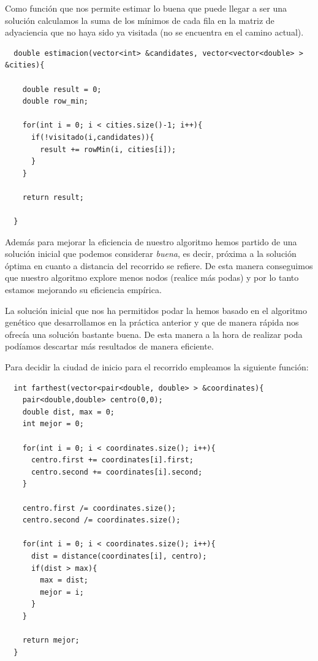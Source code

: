 \documentclass{article}
\begin{document}
Como función que nos permite estimar lo buena que puede llegar a ser
una solución calculamos la suma de los mínimos de cada fila en la
matriz de adyaciencia que no haya sido ya visitada (no se encuentra en
el camino actual).

\begin{lstlisting}
  double estimacion(vector<int> &candidates, vector<vector<double> > &cities){

    double result = 0;
    double row_min;

    for(int i = 0; i < cities.size()-1; i++){
      if(!visitado(i,candidates)){
        result += rowMin(i, cities[i]);
      }
    }

    return result;

  }
\end{lstlisting}

Además para mejorar la eficiencia de nuestro algoritmo hemos partido
de una solución inicial que podemos considerar \textit{buena}, es
decir, próxima a la solución óptima en cuanto a distancia del
recorrido se refiere. De esta manera conseguimos que nuestro algoritmo
explore menos nodos (realice más podas) y por lo tanto estamos
mejorando su eficiencia empírica.

La solución inicial que nos ha permitidos podar la hemos basado en el
algoritmo genético que desarrollamos en la práctica anterior y que de
manera rápida nos ofrecía una solución bastante buena. De esta manera
a la hora de realizar poda podíamos descartar más resultados de manera
eficiente.

Para decidir la ciudad de inicio para el recorrido empleamos la siguiente función:

\begin{lstlisting}
  int farthest(vector<pair<double, double> > &coordinates){
    pair<double,double> centro(0,0);
    double dist, max = 0;
    int mejor = 0;

    for(int i = 0; i < coordinates.size(); i++){
      centro.first += coordinates[i].first;
      centro.second += coordinates[i].second;
    }
    
    centro.first /= coordinates.size();
    centro.second /= coordinates.size();
    
    for(int i = 0; i < coordinates.size(); i++){
      dist = distance(coordinates[i], centro);
      if(dist > max){
     	max = dist;
     	mejor = i;
      }
    }

    return mejor;
  }
\end{lstlisting}
\end{document}
